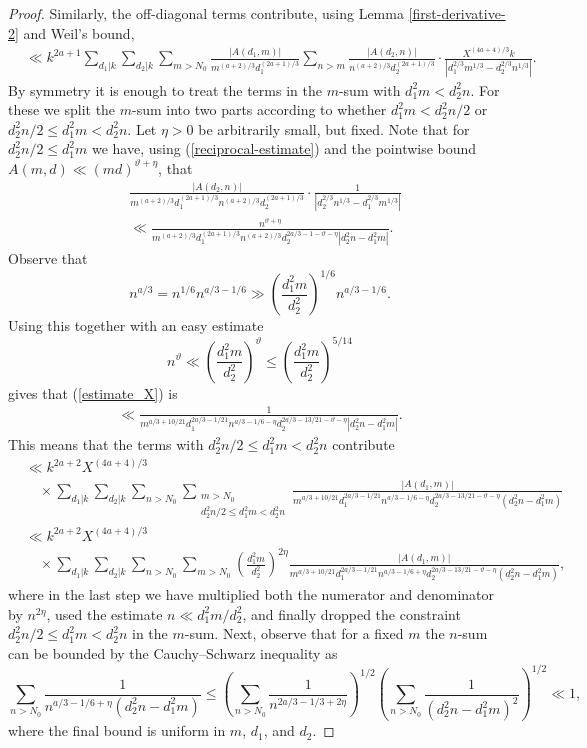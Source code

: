 \documentclass[a4paper,10pt,twoside]{amsart}
\theoremstyle{definition}
\numberwithin{equation}{section}
\renewcommand\:{\colon}
\begin{document}
\begin{proof}
Similarly, the off-diagonal terms contribute, using Lemma \ref{first-derivative-2} and Weil's bound, 
\begin{align*}
&\ll k^{2a+1}\sum_{d_1|k}\sum_{d_2|k}\sum_{m>N_0}\frac{\left|A(d_1,m)\right|}{m^{(a+2)/3}d_1^{(2a+1)/3}}\sum_{n>m}\frac{\left|A(d_2,n)\right|}{n^{(a+2)/3}d_2^{(2a+1)/3}}\cdot\frac{X^{(4a+4)/3}k}{|d_1^{2/3}m^{1/3}-d_2^{2/3}n^{1/3}|}.
\end{align*}
By symmetry it is enough to treat the terms in the $m$-sum with $d_1^2m<d_2^2n$. For these we split the $m$-sum into two parts according to whether $d_1^2m<d_2^2n/2$ or $d_2^2n/2\leq d_1^2m<d_2^2n$. Let $\eta>0$ be arbitrarily small, but fixed. Note that for $d_2^2n/2\leq d_1^2m$ we have, using (\ref{reciprocal-estimate}) and the pointwise bound $A(m,d)\ll (md)^{\vartheta+\eta}$, that 
\begin{align}\label{estimate_X}
&\frac{|A(d_2,n)|}{m^{(a+2)/3}d_1^{(2a+1)/3}n^{(a+2)/3}d_2^{(2a+1)/3}}\cdot\frac1{|d_2^{2/3}n^{1/3}-d_1^{2/3}m^{1/3}|} \nonumber\\
&\ll\frac{n^{\vartheta+\eta}}{m^{(a+2)/3}d_1^{(2a+1)/3}n^{(a+2)/3}d_2^{2a/3-1-\vartheta-\eta}|d_2^2n-d_1^2m|}.
\end{align}
Observe that 
\[ 
n^{a/3}=n^{1/6}n^{a/3-1/6}\gg\left(\frac{d_1^2m}{d_2^2}\right)^{1/6}n^{a/3-1/6}.\]
Using this together with an easy estimate
\[ 
n^\vartheta\ll\left(\frac{d_1^2m}{d_2^2}\right)^\vartheta\leq\left(\frac{d_1^2m}{d_2^2}\right)^{5/14}\]
gives that (\ref{estimate_X}) is
\begin{align*}
\ll \frac1{m^{a/3+10/21}d_1^{2a/3-1/21}n^{a/3-1/6-\eta}d_2^{2a/3-13/21-\vartheta-\eta}|d_2^2n-d_1^2m|}.
\end{align*}
This means that the terms with $d_2^2n/2\leq d_1^2m<d_2^2n$ contribute
\begin{align*}
&\ll k^{2a+2}X^{(4a+4)/3}\\
&\quad\times\sum_{d_1|k}\sum_{d_2|k}\sum_{n>N_0}\sum_{\substack{m>N_0\\
d_2^2n/2\leq d_1^2m<d_2^2n}}\frac{\left|A(d_1,m)\right|}{m^{a/3+10/21}d_1^{2a/3-1/21}n^{a/3-1/6-\eta}d_2^{2a/3-13/21-\vartheta-\eta}(d_2^2n-d_1^2m)}\\
&\ll k^{2a+2}X^{(4a+4)/3}\\
&\quad\times\sum_{d_1|k}\sum_{d_2|k}\sum_{n>N_0}\sum_{m>N_0}\left(\frac{d_1^2m}{d_2^2}\right)^{2\eta}\frac{\left|A(d_1,m)\right|}{m^{a/3+10/21}d_1^{2a/3-1/21}n^{a/3-1/6+\eta}d_2^{2a/3-13/21-\vartheta-\eta}(d_2^2n-d_1^2m)},
\end{align*}
where in the last step we have multiplied both the numerator and denominator by $n^{2\eta}$, used the estimate $n\ll d_1^2m/d_2^2$, and finally dropped the constraint $d_2^2n/2\leq d_1^2m<d_2^2n$ in the $m$-sum. Next, observe that for a fixed $m$ the $n$-sum can be bounded by the Cauchy--Schwarz inequality as
\[ 
\sum_{n>N_0}\frac1{n^{a/3-1/6+\eta}(d_2^2n-d_1^2m)}\leq\left(\sum_{n>N_0}\frac1{n^{2a/3-1/3+2\eta}}\right)^{1/2}\left(\sum_{n>N_0}\frac1{(d_2^2n-d_1^2m)^2}\right)^{1/2}\ll 1,\]
where the final bound is uniform in $m$, $d_1$, and $d_2$. 


\end{proof}
\end{document}
